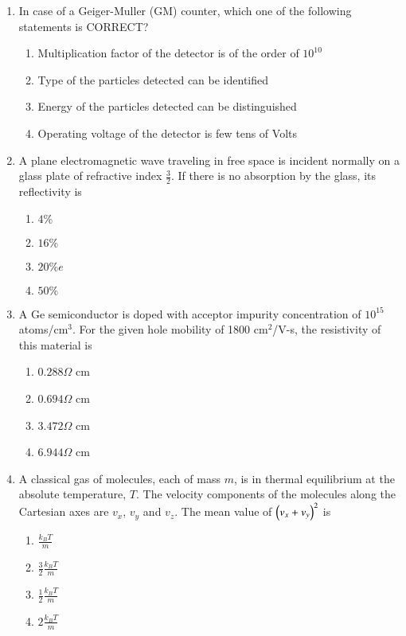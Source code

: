 \documentclass[journal]{IEEEtran}
\begin{document}
\begin{enumerate}
\item In case of a Geiger-Muller (GM) counter, which one of the following statements is CORRECT?
\begin{multicols}{2}
    \begin{enumerate}
        \item Multiplication factor of the detector is of the order of $10^{10}$
        \item Type of the particles detected can be identified
        \item Energy of the particles detected can be distinguished
        \item Operating voltage of the detector is few tens of Volts
    \end{enumerate}
\end{multicols}

\item A plane electromagnetic wave traveling in free space is incident normally on a glass plate of
refractive index $\frac{3}{2}$. If there is no absorption by the glass, its reflectivity is
\begin{multicols}{2}
    \begin{enumerate}
        \item $4 \%$
        \item $16 \%$
        \item $20 \%e$
        \item $50 \%$
    \end{enumerate}
\end{multicols}

\item A Ge semiconductor is doped with acceptor impurity concentration of $10^{15}$ atoms/cm$^3$. For the given hole mobility of 1800 cm$^{2}$/V-s, the resistivity of this material is
\begin{multicols}{2}
    \begin{enumerate}
        \item $0.288 \Omega$ cm
        \item $0.694 \Omega$ cm
        \item $3.472 \Omega$ cm
        \item $6.944 \Omega$ cm
    \end{enumerate}
\end{multicols}

\item A classical gas of molecules, each of mass $m$, is in thermal equilibrium at the absolute temperature, $T$. The velocity components of the molecules along the Cartesian axes are $v_x$, $v_y$ and $v_z$. The mean value of $\left(v_x + v_y\right)^2$ is
\begin{multicols}{2}
    \begin{enumerate}
        \item $\frac{k_B T}{m}$
        \item $\frac{3}{2} \frac{k_B T}{m}$
        \item $\frac{1}{2} \frac{k_B T}{m}$
        \item $2\frac{k_B T}{m}$
    \end{enumerate}
\end{multicols}
\end{enumerate}
\end{document}
